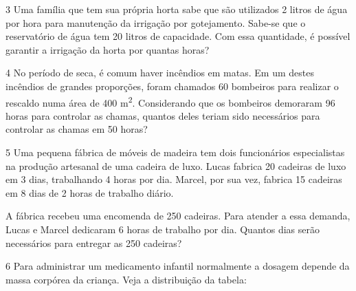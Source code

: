 \num{3} Uma família que tem sua própria horta sabe que são utilizados 2
litros de água por hora para manutenção da irrigação por gotejamento.
Sabe-se que o reservatório de água tem 20 litros de capacidade. Com essa
quantidade, é possível garantir a irrigação da horta por quantas horas?

\begin{emptybox}
\end{emptybox}

\num{4} No período de seca, é comum haver incêndios em matas. Em um destes
incêndios de grandes proporções, foram chamados 60 bombeiros para
realizar o rescaldo numa área de 400 m\textsuperscript{2}. Considerando 
que os bombeiros demoraram 96 horas para controlar as chamas, quantos 
deles teriam sido necessários para controlar as chamas em 50 horas?


\num{5} Uma pequena fábrica de móveis de madeira tem dois funcionários
especialistas na produção artesanal de uma cadeira de luxo. Lucas
fabrica 20 cadeiras de luxo em 3 dias, trabalhando 4 horas por dia.
Marcel, por sua vez, fabrica 15 cadeiras em 8 dias de 2 horas
de trabalho diário.

A fábrica recebeu uma encomenda de 250 cadeiras. Para atender a essa demanda,
Lucas e Marcel dedicaram 6 horas de trabalho por dia. Quantos dias serão
necessários para entregar as 250 cadeiras?

\begin{emptybox}
\end{emptybox}

\pagebreak
\num{6} Para administrar um medicamento infantil normalmente a dosagem
depende da massa corpórea da criança. Veja a distribuição da tabela:

